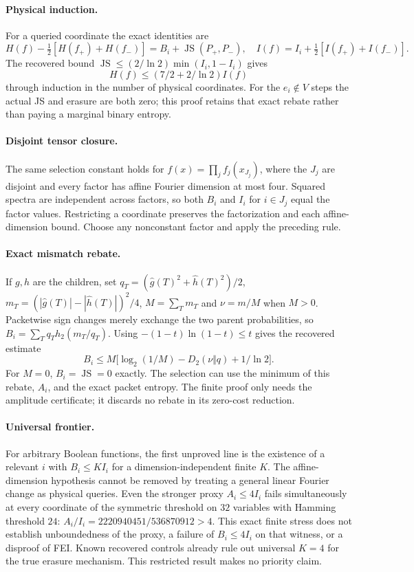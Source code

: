 \documentclass{article}
\begin{document}
\paragraph{Physical induction.} For a queried coordinate the exact identities are
\[
H(f)-\tfrac12[H(f_+)+H(f_-)]=B_i+\operatorname{JS}(P_+,P_-),\quad
I(f)=I_i+\tfrac12[I(f_+)+I(f_-)].
\]
The recovered bound $\operatorname{JS}\le(2/\ln2)\min(I_i,1-I_i)$ gives
\[
 H(f)\le(7/2+2/\ln2)I(f)
\]
through induction in the number of physical coordinates. For the $e_i\notin V$
steps the actual JS and erasure are both zero; this proof retains that exact
rebate rather than paying a marginal binary entropy.

\paragraph{Disjoint tensor closure.} The same selection constant holds for
$f(x)=\prod_j f_j(x_{J_j})$, where the $J_j$ are disjoint and every factor has
affine Fourier dimension at most four. Squared spectra are independent across
factors, so both $B_i$ and $I_i$ for $i\in J_j$ equal the factor values.
Restricting a coordinate preserves the factorization and each affine-dimension
bound. Choose any nonconstant factor and apply the preceding rule.

\paragraph{Exact mismatch rebate.} If $g,h$ are the children, set
$q_T=(\widehat g(T)^2+\widehat h(T)^2)/2$,
$m_T=(|\widehat g(T)|-|\widehat h(T)|)^2/4$, $M=\sum_Tm_T$ and
$\nu=m/M$ when $M>0$. Packetwise sign changes merely exchange the two parent
probabilities, so $B_i=\sum_Tq_Th_2(m_T/q_T)$. Using
$-(1-t)\ln(1-t)\le t$ gives the recovered estimate
\[
B_i\le M\big[\log_2(1/M)-D_2(\nu\Vert q)+1/\ln2\big].
\]
For $M=0$, $B_i=\operatorname{JS}=0$ exactly. The selection can use the minimum
of this rebate, $A_i$, and the exact packet entropy. The finite proof only needs
the amplitude certificate; it discards no rebate in its zero-cost reduction.

\paragraph{Universal frontier.} For arbitrary Boolean functions, the first
unproved line is the existence of a relevant $i$ with $B_i\le K I_i$ for a
dimension-independent finite $K$. The affine-dimension hypothesis cannot be
removed by treating a general linear Fourier change as physical queries.
Even the stronger proxy $A_i\le4I_i$ fails simultaneously at every coordinate
of the symmetric threshold on $32$ variables with Hamming threshold $24$:
$A_i/I_i=2220940451/536870912>4$. This exact finite stress does not establish
unboundedness of the proxy, a failure of $B_i\le4I_i$ on that witness, or a
disproof of FEI. Known recovered controls already rule out universal $K=4$
for the true erasure mechanism. This restricted result makes no priority claim.
\end{document}

